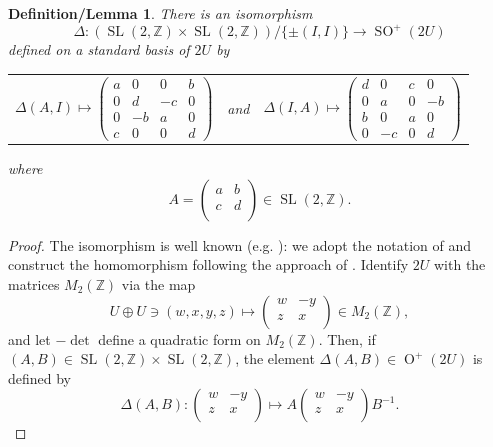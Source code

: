 \documentclass[12pt, a4paper]{article}
\newtheorem{deflem}[thm]{Definition/Lemma}
\newcommand{\ZZ}{\mathbb{Z}}
\newcommand{\opn}{\operatorname}
\newcommand{\op}{\oplus}
\begin{document}
\begin{deflem}\label{SL2emb}
  There is an isomorphism 
  \[
    \Delta:  (\opn{SL}(2, \ZZ) \times \opn{SL}(2, \ZZ))/\{\pm (I, I) \} \rightarrow \opn{SO}^+(2U)
  \]
  defined on a standard basis of $2U$ by
  \begin{center}
    \begin{tabular}{c c c}
      $\Delta(A,I) \mapsto
      \begin{pmatrix}
        a & 0 & 0 & b \\
        0 & d & -c & 0 \\
        0 & -b & a & 0 \\
        c & 0 & 0 & d
      \end{pmatrix}$
      & 
      and
      &
      $  \Delta(I, A) \mapsto
      \begin{pmatrix}
        d & 0 & c & 0 \\
        0 & a & 0 & -b \\
        b & 0 & a & 0 \\
        0 & -c & 0 & d
      \end{pmatrix}$
    \end{tabular}
  \end{center}
  where 
  \begin{equation*}
    A =
    \begin{pmatrix}
      a & b \\
      c & d \\
    \end{pmatrix} \in \opn{SL}(2, \ZZ).
  \end{equation*}
\end{deflem}
\begin{proof}
  The isomorphism is well known (e.g. \cite{sterk}): we adopt the notation of \cite{Brasch} and construct the homomorphism following the approach of \cite{abelianisation}.
Identify $2U$ with the matrices $M_2(\ZZ)$ via the map
\[
  U \op U
    \ni (w,x,y,z)
    \mapsto 
    \begin{pmatrix}
      w & -y \\
      z & x \\
    \end{pmatrix}
    \in M_2(\ZZ),
\]
and let $-\opn{det}$ define a quadratic form on $M_2(\ZZ)$. 
Then, if $(A, B) \in \opn{SL}(2, \ZZ) \times \opn{SL}(2, \ZZ)$, the element $\Delta(A, B) \in \opn{O}^+(2U)$ is defined by 
\[
\Delta(A, B):
    \begin{pmatrix}
      w & -y \\
      z & x \\
    \end{pmatrix}
    \mapsto
    A
    \begin{pmatrix}
      w & -y \\
      z & x \\
    \end{pmatrix}
    B^{-1}.
    \]
\end{proof}
\end{document}
